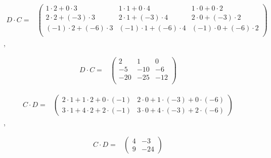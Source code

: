 \documentclass[
]{article}
\begin{document}
\begin{equation*}
  \begin{array}{ccc}
    D\cdot C = & \begin{pmatrix} 
                          1\cdot 2 + 0\cdot 3 & 1\cdot 1 + 0\cdot 4 & 1\cdot 0 + 0\cdot 2   \\
                          2\cdot 2 + (-3)\cdot 3 & 2\cdot 1 + (-3)\cdot 4 & 2\cdot 0 + (-3)\cdot 2   \\
                          (-1)\cdot 2 + (-6)\cdot 3 & (-1)\cdot 1 + (-6)\cdot 4 & (-1)\cdot 0 + (-6)\cdot 2   \\
                  \end{pmatrix} &    
  \end{array}
\end{equation*},

\begin{equation*}
  \begin{array}{ccc}
    D\cdot C = & \begin{pmatrix} 
                          2   & 1    & 0   \\
                          -5  & -10 &-6   \\
                          -20 & -25 & -12   \\
                  \end{pmatrix} &    
  \end{array}
\end{equation*}

\begin{equation*}
  \begin{array}{ccc}
C\cdot D = & \begin{pmatrix} 
            2\cdot 1 + 1\cdot 2 + 0\cdot(-1) &   2\cdot 0 + 1\cdot(-3) + 0\cdot(-6)   \\
            3\cdot 1 + 4\cdot 2 + 2\cdot(-1) &   3\cdot 0 + 4\cdot(-3) + 2\cdot(-6)
            \end{pmatrix} &    
  \end{array}
\end{equation*},

\begin{equation*}
  \begin{array}{ccc}
    C\cdot D = & \begin{pmatrix} 
                           4   & -3    \\
                           9   & -24    
                  \end{pmatrix} &    
  \end{array}
\end{equation*}
\end{document}

